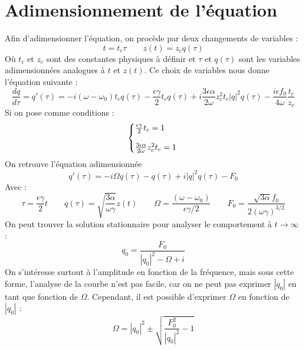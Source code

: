 \section{Adimensionnement de l'équation}
%
Afin d'adimensionner l'équation, on procède par deux changements de variables :
%
\begin{equation}
    t = t_c \tau
    \qquad 
    z(t) = z_c q(\tau)
\end{equation}
Où $t_c$ et $z_c$ sont des constantes physiques à définir et $\tau$ et $q(\tau)$ sont les variables adimensionnées analogues à $t$ et $z(t)$.
Ce choix de variables nous donne l'équation suivante :
%
\begin{equation}
    \frac{dq}{d\tau} = q'(\tau) = -i(\omega - \omega_0)t_c q(\tau) - \frac{\epsilon\gamma}{2}t_c q(\tau) + i \frac{3\epsilon\alpha}{2\omega}z_c^2t_c |q|^2q(\tau) - \frac{i\epsilon f_0}{4\omega}\frac{t_c}{z_c}
\end{equation}
%
Si on pose comme conditions :
%
\begin{equation}
    \left\{
    \begin{array}{@{}l@{}}
        \frac{\epsilon\gamma}{2}t_c = 1 \\
        \\
        \frac{3\epsilon\alpha}{2\omega}z_c^2t_c = 1
    \end{array}
    \right.\,
\end{equation}
%
On retrouve l'équation adimensionnée
%
\begin{equation}
    q'(\tau) = -i\Omega q(\tau) - q(\tau) + i|q|^2q(\tau) - F_0
\end{equation}
%
Avec :
%
\begin{equation}
    \tau = \frac{\epsilon\gamma}{2}t
    \qquad
    q(\tau) = \sqrt{\frac{3\alpha}{\omega\gamma}}z(t)
    \qquad
    \Omega = \frac{(\omega - \omega_0)}{\epsilon\gamma/2}
    \qquad
    F_0 = \frac{\sqrt{3\alpha}f_0}{2(\omega \gamma)^{3/2}}
\end{equation}
%
On peut trouver la solution stationnaire pour analyser le comportement à $t\to\infty$ :
%
\begin{equation}
    q_0 = \frac{F_0}{|q_0|^2 - \Omega + i}
    \label{eq:duff_stat}
\end{equation}
%
On s'intéresse surtout à l'amplitude en fonction de la fréquence, 
mais sous cette forme, l'analyse de la courbe n'est pas facile, car on ne peut pas exprimer $|q_0|$ en tant que fonction de $\Omega$. 
Cependant, il est possible d'exprimer $\Omega$ en fonction de $|q_0|$ :
%
\begin{equation}
    \Omega = |q_0|^2 \pm \sqrt{\frac{F_0^2}{|q_0|^2} - 1 }
    \label{eq:duff_response}
\end{equation}

